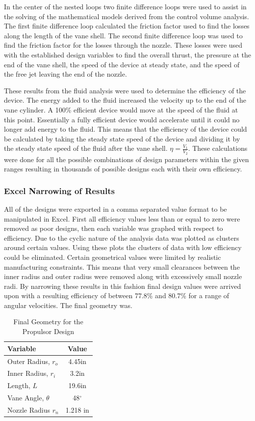\documentclass{report}
\begin{document}
In the center of the nested loops two finite difference loops were used to assist in the solving of the mathematical models derived from the control volume analysis. The first finite difference loop calculated the friction factor used to find the losses along the length of the vane shell. The second finite difference loop was used to find the friction factor for the losses through the nozzle. These losses were used with the established design variables to find the overall thrust, the pressure at the end of the vane shell, the speed of the device at steady state, and the speed of the free jet leaving the end of the nozzle.\par
These results from the fluid analysis were used to determine the efficiency of the device. The energy added to the fluid increased the velocity up to the end of the vane cylinder. A 100\% efficient device would move at the speed of the fluid at this point. Essentially a fully efficient device would accelerate until it could no longer add energy to the fluid. This means that the efficiency of the device could be calculated by taking the steady state speed of the device and dividing it by the steady state speed of the fluid after the vane shell. $\eta=\frac{V_1}{V_2}$. These calculations were done for all the possible combinations of design parameters within the given ranges resulting in thousands of possible designs each with their own efficiency.\par
\subsubsection{Excel Narrowing of Results}
All of the designs were exported in a comma separated value format to be manipulated in Excel. First all efficiency values less than or equal to zero were removed as poor designs, then each variable was graphed with respect to efficiency. Due to the cyclic nature of the analysis data was plotted as clusters around certain values. Using these plots the clusters of data with low efficiency could be eliminated. Certain geometrical values were limited by realistic manufacturing constraints. This means that very small clearances between the inner radius and outer radius were removed along with  excessively small nozzle radi. By narrowing these results in this fashion final design values were arrived upon with a resulting efficiency of between 77.8\% and 80.7\% for a range of angular velocities. The final geometry was.
\begin{table}[h]
\begin{center}
\begin{tabular}{l|c}
Variable& Value\\
\hline
Outer Radius, $r_o$&4.45in\\
Inner Radius, $r_i$&3.2in\\
Length, $L$ &19.6in\\
Vane Angle, $\theta$&48$^{\circ}$\\
Nozzle Radius $r_n$&1.218 in\\
\hline
\end{tabular}
\end{center}
\caption{Final Geometry for the Propulsor Design}
\end{table}
\end{document}
